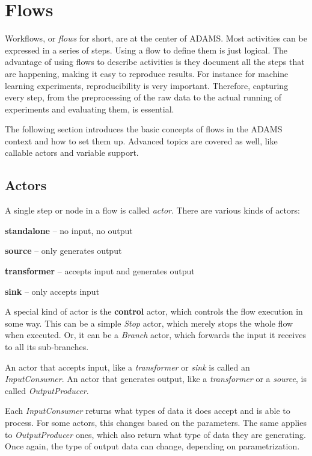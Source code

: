 \chapter{Flows}
\label{flows}
Workflows, or \textit{flows} for short, are at the center of ADAMS. Most
activities can be expressed in a series of steps. Using a flow to define them is
just logical. The advantage of using flows to describe activities is they
document all the steps that are happening, making it easy to reproduce results.
For instance for machine learning experiments, reproducibility is very important. Therefore,
capturing every step, from the preprocessing of the raw data to the actual
running of experiments and evaluating them, is essential.

The following section introduces the basic concepts of flows in the ADAMS
context and how to set them up. Advanced topics are covered as well, like
callable actors and variable support.

\section{Actors}
A single step or node in a flow is called \textit{actor}. There are various
kinds of actors:
\begin{tight_itemize}
  \item \textbf{standalone} -- no input, no output
  \item \textbf{source} -- only generates output
  \item \textbf{transformer} -- accepts input and generates output
  \item \textbf{sink} -- only accepts input
\end{tight_itemize}
A special kind of actor is the \textbf{control} actor, which controls the flow
execution in some way. This can be a simple \textit{Stop} actor, which merely
stops the whole flow when executed. Or, it can be a \textit{Branch} actor, which
forwards the input it receives to all its sub-branches.

An actor that accepts input, like a \textit{transformer} or \textit{sink} is
called an \textit{InputConsumer}. An actor that generates output, like
a \textit{transformer} or a \textit{source}, is called \textit{OutputProducer}.

Each \textit{InputConsumer} returns what types of data it does accept and is
able to process. For some actors, this changes based on the parameters. The same
applies to \textit{OutputProducer} ones, which also return what type of data
they are generating. Once again, the type of output data can change, depending
on parametrization.

